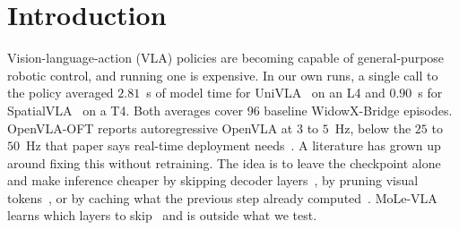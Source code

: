 %
%
%
%
%

\section{Introduction}

Vision-language-action (VLA) policies are becoming capable of general-purpose
robotic control, and running one is expensive. In our own runs, a single call
to the policy averaged $2.81$~s of model time for UniVLA~\cite{univla} on an
L4 and $0.90$~s for SpatialVLA~\cite{spatialvla} on a T4. Both averages cover
96 baseline WidowX-Bridge episodes. OpenVLA-OFT reports autoregressive OpenVLA
at $3$ to $5$~Hz, below the $25$ to $50$~Hz that paper says real-time
deployment needs~\cite{openvlaoft}. A literature has grown up around fixing
this without retraining. The idea is to leave the checkpoint alone and make
inference cheaper by skipping decoder layers~\cite{shortgpt, efficientvla}, by
pruning visual tokens~\cite{fastv}, or by caching what the previous step
already computed~\cite{vlacache, efficientvla}. MoLe-VLA learns which layers
to skip~\cite{molevla} and is outside what we test.

